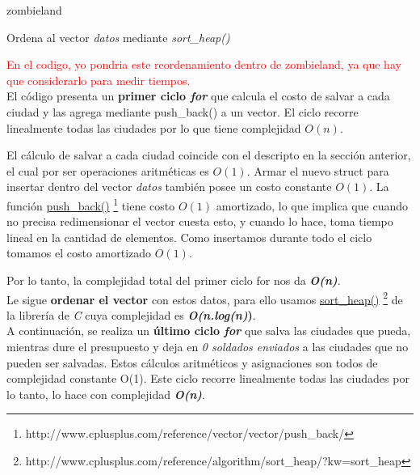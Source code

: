 \documentclass[a4paper]{article}
\begin{document}
\begin{algorithm}[h!]
\caption{zombieland}
Ordena al vector \emph{datos} mediante \textit{sort_heap()}\\
\end{algorithm}
\textcolor{red}{En el codigo, yo pondria este reordenamiento dentro de zombieland, ya que hay que considerarlo para medir tiempos.}\\

El c\'odigo presenta un \textbf{primer ciclo \emph{for}} que calcula el costo de salvar a cada ciudad y las agrega mediante push_back() a un vector. El ciclo recorre linealmente todas las ciudades por lo que tiene complejidad $O(n)$. 

El c\'alculo de salvar a cada ciudad coincide con el descripto en la secci\'on anterior, el cual por ser operaciones aritm\'eticas es $O(1)$. Armar el nuevo struct para insertar dentro del vector \emph{datos} tambi\'en posee un costo constante $O(1)$. La funci\'on \href{http://www.cplusplus.com/reference/vector/vector/push_back/}{push\_back()} \footnote{http://www.cplusplus.com/reference/vector/vector/push_back/} tiene costo $O(1)$ amortizado, lo que implica que cuando no precisa redimensionar el vector cuesta esto, y cuando lo hace, toma tiempo lineal en la cantidad de elementos. Como insertamos durante todo el ciclo tomamos el costo amortizado $O(1)$. 

Por lo tanto, la complejidad total del primer ciclo for nos da \textbf{\textit{O(n)}}.\\

Le sigue \textbf{ordenar el vector} con estos datos, para ello usamos \href{http://www.cplusplus.com/reference/algorithm/sort_heap/?kw=sort_heap}{sort\_heap()} \footnote{http://www.cplusplus.com/reference/algorithm/sort_heap/?kw=sort_heap} de la librer\'ia de \emph{C} cuya complejidad es \textbf{\textit{O(n.log(n)})}.\\

A continuaci\'on, se realiza un \textbf{\'ultimo ciclo \emph{for}} que salva las ciudades que pueda, mientras dure el presupuesto y deja en \emph{0 soldados enviados} a las ciudades que no pueden ser salvadas. Estos c\'alculos aritm\'eticos y asignaciones son todos de complejidad constante O(1). Este ciclo recorre linealmente todas las ciudades por lo tanto, lo hace con complejidad \textbf{\textit{O(n)}}.\\
\end{document}
